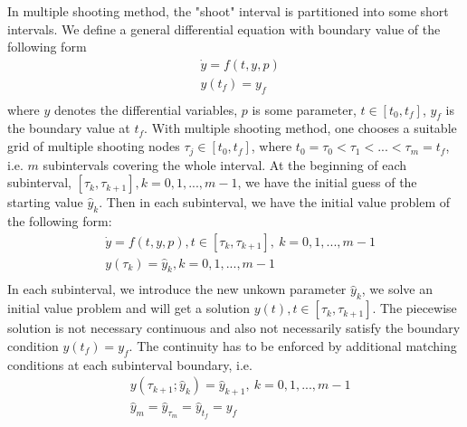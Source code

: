 \documentclass  [
  paper    = a4,
  BCOR     = 10mm,
  twoside,
  fontsize = 12pt,
  fleqn,
  toc      = bibnumbered,
  toc      = listofnumbered,
  numbers  = noendperiod,
  headings = normal,
  listof   = leveldown,
  version  = 3.03
]                                       {scrreprt}
\newcommand{\<}{\langle}
\renewcommand{\>}{\rangle}
\begin{document}
   In multiple shooting method, the "shoot" interval is partitioned into some short intervals. We define a general differential equation with boundary value of the following form
   \begin{equation}\label{eqn:ori_dae}
   \begin{aligned}
   & \dot{y} = f(t, y, p) \\ 
   & y(t_f) = y_f  \\
   \end{aligned}
   \end{equation}
   where $y$ denotes the differential variables, $p$ is some parameter, $t \in [t_0, t_f]$,  $y_f$ is the boundary value at $t_f$.  With multiple shooting method, one chooses a suitable grid of multiple shooting nodes $\tau_j \in [t_0,t_f] $, where $t_0 = \tau_0 < \tau_1 < ... < \tau_m = t_f$,  i.e. $m$ subintervals covering the whole interval. At the beginning of each subinterval, $[\tau_k, \tau_{k+1}], k = 0, 1, ..., m-1$, we have the initial guess of the starting value $\hat{y}_k$. Then in each subinterval, we have the initial value problem of the following form: 
   \begin{equation}\label{eqn:msh}
   \begin{aligned}
   & \dot{y} = f(t, y, p) , t \in [\tau_k, \tau_{k+1}], \ k = 0, 1, ..., m-1   \\ 
   & y(\tau_k) = \hat{y}_k, k = 0, 1, ..., m-1  \\
   \end{aligned}
   \end{equation}
   In each subinterval, we introduce the new unkown parameter $\hat{y}_k$, we solve an initial value problem and will get a solution $y(t), t \in [\tau_k, \tau_{k+1}]$. The piecewise solution is not necessary continuous and also not necessarily satisfy the boundary condition $y(t_f) = y_f$. The continuity has to be enforced by additional matching conditions at each subinterval boundary, i.e. 
   \begin{equation}\label{eqn:mc}
   \begin{aligned}
   & y(\tau_{k+1}; \hat{y}_k) = \hat{y}_{k+1}, \  k = 0, 1, ..., m-1  \\
   & \hat{y}_{m} = \hat{y}_{\tau_m} = \hat{y}_{t_f} =  y_f 
   \end{aligned}
   \end{equation}
   
\end{document}
